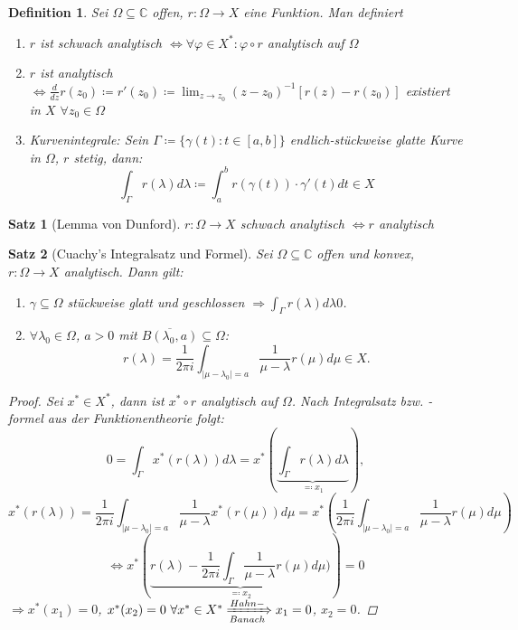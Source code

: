 \documentclass[12pt]{extreport} %
\newcommand{\C}{\mathbb{C}}
\theoremstyle{named}
\theoremstyle{nnamed}
\theoremstyle{itshape}
\newtheorem{definition}{Definition}  \counterwithin{definition}{chapter}
\theoremstyle{normal}
\newtheorem*{satz}{Satz}
\begin{document}
\begin{definition}
	Sei $\Omega \subseteq \C$ offen, $r \colon \Omega \rightarrow X$ eine Funktion. Man definiert
	\begin{enumerate}
		\item $r$ ist schwach analytisch $\iff \forall \varphi \in X^* \colon \varphi \circ r$ analytisch auf $\Omega$
		\item $r$ ist analytisch $\iff \frac{d}{dz} r(z_0) \coloneqq r'(z_0) \coloneqq \lim_{z \rightarrow z_0} \left( z - z_0 \right)^{-1} \left[ r(z) - r(z_0) \right]$ existiert in $X$ $\forall z_0 \in \Omega$ 
		\item Kurvenintegrale: Sein $\Gamma \coloneqq \big\{ \gamma(t) \colon t \in [a, b] \big\}$ endlich-stückweise glatte Kurve in $\Omega$, $r$ stetig, dann:
		$$ \int_{\Gamma} r(\lambda) d\lambda \coloneqq \int_a^b r\left( \gamma(t) \right) \cdot \gamma'(t) dt \in X $$
	\end{enumerate}
\end{definition}

\begin{satz}[Lemma von Dunford]
	$r \colon \Omega \rightarrow X$ schwach analytisch $\iff r$ analytisch
\end{satz}

\begin{satz}[Cuachy's Integralsatz und Formel]
	Sei $\Omega \subseteq \C$ offen und konvex, $r \colon \Omega \rightarrow X$ analytisch. Dann gilt:
	\begin{enumerate}
		\item $\gamma \subseteq \Omega$ stückweise glatt und geschlossen $\Rightarrow \int_{\Gamma} r(\lambda) d \lambda  0$.
		\item $\forall \lambda_0 \in \Omega$, $a > 0$ mit $\overline{B(\lambda_0, a)} \subseteq \Omega$:
			$$ r(\lambda) = \frac{1}{2 \pi i} \int_{|\mu - \lambda_0| = a} \frac{1}{\mu - \lambda} r(\mu) d \mu \in X. $$
	\end{enumerate}	
	\begin{proof}
		Sei $x^{*} \in X^*$, dann ist $x^{*} \circ r$ analytisch auf $\Omega$. Nach Integralsatz bzw. -formel aus der Funktionentheorie folgt:
			$$ 0 = \int_{\Gamma} x^{*}\left(r(\lambda) \right) d \lambda = x^{*} \left( \underbrace{\int_{\Gamma} r(\lambda) d\lambda}_{\eqqcolon x_1} \right), $$
			$$ x^*\left( r(\lambda) \right) = \frac{1}{2\pi i} \int_{|\mu - \lambda_0|=a} \frac{1}{\mu - \lambda} x^*\left(r(\mu) \right) d\mu = x^* \left( \frac{1}{2 \pi i} \int_{|\mu - \lambda_0| = a} \frac{1}{\mu - \lambda} r(\mu) d \mu \right) $$
			$$ \iff x^{*} \left( \underbrace{r(\lambda) - \frac{1}{2 \pi i} \int_{\Gamma} \frac{1}{\mu - \lambda} r(\mu) d \mu)}_{\eqqcolon x_2 }  \right)= 0 $$
			$\Rightarrow x^*(x_1) = 0$, $x^*(x_2) = 0 ~\forall x^* \in X^* \xRightarrow[Banach]{Hahn-} x_1 = 0$, $x_2 = 0$.
	\end{proof}
\end{satz}
\end{document}
